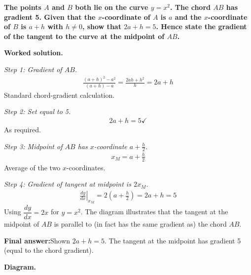 \documentclass[11pt]{article}
\newcommand{\question}[1]{\par\medskip\noindent\textbf{#1}\par}
\begin{document}
\question{The points \( A \) and \( B \) both lie on the curve \( y = x^2 \). The chord \( AB \) has gradient 5. Given that the \( x \)-coordinate of \( A \) is \( a \) and the \( x \)-coordinate of \( B \) is \( a + h \) with \( h \neq 0 \), show that \( 2a + h = 5 \). Hence state the gradient of the tangent to the curve at the midpoint of \( AB \).}

\textbf{Worked solution.}

\textit{Step 1: Gradient of \( AB \).}
\[\begin{gathered}
\frac{(a+h)^2 - a^2}{(a+h) - a} = \frac{2ah + h^2}{h} = 2a + h
\end{gathered}\]
Standard chord-gradient calculation.

\textit{Step 2: Set equal to 5.}
\[\begin{gathered}
2a + h = 5 \checkmark
\end{gathered}\]
As required.

\textit{Step 3: Midpoint of \( AB \) has \( x \)-coordinate \( a + \tfrac{h}{2} \).}
\[\begin{gathered}
x_M = a + \frac{h}{2}
\end{gathered}\]
Average of the two \( x \)-coordinates.

\textit{Step 4: Gradient of tangent at midpoint is \( 2x_M \).}
\[\begin{gathered}
\left.\frac{dy}{dx}\right|_{x_M} = 2\!\left(a + \frac{h}{2}\right) = 2a + h = 5
\end{gathered}\]
Using \( \dfrac{dy}{dx} = 2x \) for \( y = x^2 \). The diagram illustrates that the tangent at the midpoint of \( AB \) is parallel to (in fact has the same gradient as) the chord \( AB \).

\begin{answerbox}
\textbf{Final answer:}\quad Shown \(\displaystyle  2a + h = 5 \). The tangent at the midpoint has gradient 5 (equal to the chord gradient).
\end{answerbox}
\textbf{Diagram.}
\end{document}
